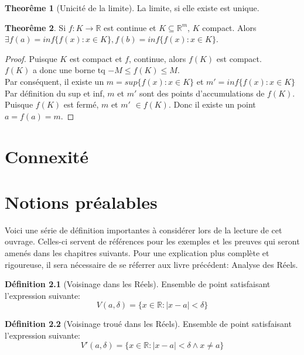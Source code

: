 \documentclass[12pt]{book}
\let\Bbb\mathbb
\theoremstyle{definition}
\newtheorem{definition}{Définition}[section]
\newtheorem{theorem}{Theorême}[section]
\begin{document}
\begin{theorem}[Unicité de la limite]
    \label{thm:limite_unique}
    La limite, si elle existe est unique.
\end{theorem}

\begin{theorem}
    Si $f: K \to \Bbb R$ est continue et $K \subseteq \Bbb R^m$, $K$ compact. Alors $\exists f(a) = inf\{f(x) : x \in K\}, f(b) = inf\{f(x) : x \in K\}$.
\end{theorem}

\begin{proof}
    Puisque $K$ est compact et $f$, continue, alors $f(K)$ est compact.\\
    $f(K)$ a donc une borne tq $-M \leq f(K) \leq M$.\\
    Par conséquent, il existe un $m = sup\{f(x): x \in K\}$ et $m' = inf\{f(x): x \in K\}$\\
    Par définition du sup et inf, $m$ et  $m'$ sont des points d'accumulations de $f(K)$.\\
    Puisque $f(K)$ est fermé, $m$ et $m'$ $\in f(K)$. Donc il existe un point $a = f(a) = m$.
\end{proof}

\chapter{Connexité}


\appendix
\chapter{Notions préalables}
Voici une série de définition importantes à considérer lors de la lecture de cet ouvrage. Celles-ci servent
de références pour les exemples et les preuves qui seront amenés dans les chapitres suivants. Pour une explication
plus complète et rigoureuse, il sera nécessaire de se réferrer aux livre précédent: Analyse des Réels.

\begin{definition}[Voisinage dans les Réels]
    \label{def:voisinage_reels}
    Ensemble de point satisfaisant l'expression
    suivante: $$V(a, \delta) = \{ x \in \Bbb R : |x - a| < \delta \}$$
\end{definition}

\begin{definition}[Voisinage troué dans les Réels]
    \label{def:voisinage_troue_reels}
    Ensemble de point satisfaisant l'expression
    suivante: $$V'(a, \delta) = \{ x \in \Bbb R : |x - a| < \delta \land x \neq a \}$$
\end{definition}
\end{document}
